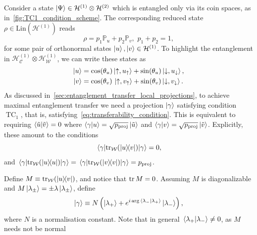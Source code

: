 \documentclass[
	aps, pra,
	superscriptaddress, twocolumn,
	floatfix,
	10pt
]{revtex4-1}
\newcommand{\on}[1]{\operatorname{#1}}
\newcommand{\parTitle}[1]{\noindent{\color{Mahogany}(\emph{#1})}}
\newcommand{\PP}{\mathbb{P}}
\newcommand{\calC}{{\mathcal{C}}}
\newcommand{\calH}{{\mathcal{H}}}
\newcommand{\calW}{{\mathcal{W}}}
\newcommand{\HC}{\calH_\calC}
\newcommand{\HW}{\calH_\calW}
\newcommand{\LI}[1]{\highlight{(LI: \textit{#1})}}
\newcommand{\commale}[1]{{\textcolor{red} {\it{[Note (Ale): #1]}}}}
\renewcommand{\parTitle}[1]{}
\begin{document}
\parTitle{Problem setting}
Consider a state $\ket\Psi\in\calH^{(1)}\otimes\calH^{(2)}$ which is entangled only via its coin spaces, as in~\cref{fig:TC1_condition_scheme}. The corresponding reduced state $\rho\in\mathrm{Lin}(\calH^{(1)})$ reads
\begin{equation}
	\rho= p_1 \PP_u + p_2 \PP_v, \,\,p_1+p_2=1,
	\label{eq:reduced_state_twodimcase}
\end{equation}
for some pair of orthonormal states $\ket u,\ket v\in\calH^{(1)}$.
To highlight the entanglement in $\HC^{(1)}\otimes\HW^{(1)}$, we can write these states as
\begin{equation}
\begin{aligned}
    \ket u &=
    \cos(\theta_u) \ket{\uparrow, u_\uparrow} +
    \sin(\theta_u) \ket{\downarrow, u_\downarrow}, \\
    \ket v &=
    \cos(\theta_v) \,\ket{\uparrow, v_\uparrow} +
    \sin(\theta_v) \ket{\downarrow, v_\downarrow}.
\end{aligned}
\end{equation}
As discussed in~\cref{sec:entanglement_transfer_local_projections}, to achieve maximal entanglement transfer we need a projection $\ket\gamma$ satisfying condition $\on{TC}_1$, that is, satisfying~\eqref{eq:transferability_condition}.
This is equivalent to requiring $\braket{\tilde u}{\tilde v}=0$ where $\braket{\gamma}{u}=\sqrt{p_{\on{proj}}}\ket{\tilde u}$ and
$\braket{\gamma}{v}=\sqrt{p_{\on{proj}}}\ket{\tilde v}$.
Explicitly, these amount to the conditions
\begin{equation}
	\mel{\gamma}{\tr_{\calW}(\ketbra{u}{v})}{\gamma} = 0,
\end{equation}
and
$\mel{\gamma}{\tr_{\calW}(\ketbra{u})}{\gamma} =
\mel{\gamma}{\tr_{\calW}(\ketbra{v})}{\gamma} = p_{\on{proj}}$.

\parTitle{Proof of main result}
Define $M\equiv \tr_{\calW}(\ketbra{u}{v})$, and notice that $\tr M=0$.
Assuming $M$ is diagonalizable and $M\ket{\lambda_\pm}=\pm\lambda\ket{\lambda_\pm}$, define
\begin{equation}
    \ket\gamma\equiv N\left(
        \ket{\lambda_+} +
        e^{i\arg\braket*{\lambda_-}{\lambda_+}} \ket{\lambda_-}
    \right),
    \label{eq:definition_projgamma_2dcase}
\end{equation}
where $N$ is a normalisation constant. Note that in general $\braket*{\lambda_+}{\lambda_-}\neq0$, as $M$ needs not be normal 
\end{document}
